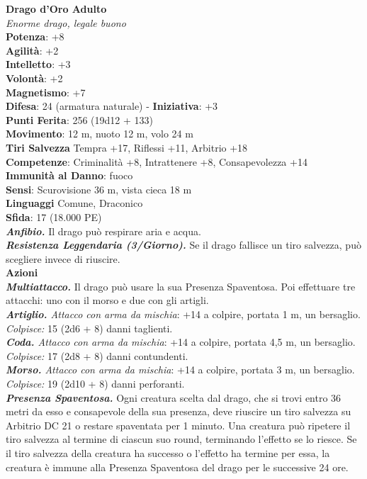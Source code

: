 \begin{multicols}{2}
\medskip\textbf{Drago d'Oro Adulto}\\
\emph{Enorme drago, legale buono}\\
\textbf{Potenza}: +8\\
\textbf{Agilità}: +2\\
\textbf{Intelletto}: +3\\
\textbf{Volontà}: +2\\
\textbf{Magnetismo}: +7\\
\textbf{Difesa}: 24 (armatura naturale) - \textbf{Iniziativa}: +3\\
\textbf{Punti Ferita}: 256 (19d12 + 133)\\
\textbf{Movimento}: 12 m, nuoto 12 m, volo 24 m\\
\textbf{Tiri Salvezza} Tempra +17, Riflessi +11, Arbitrio +18\\
\textbf{Competenze}: Criminalità +8, Intrattenere +8, Consapevolezza +14\\
\textbf{Immunità al Danno}: fuoco\\
\textbf{Sensi}: Scurovisione 36 m, vista cieca 18 m\\
\textbf{Linguaggi} Comune, Draconico\\
\textbf{Sfida}: 17 (18.000 PE)\smallskip\\
\emph{\textbf{Anfibio.}} Il drago può respirare aria e acqua.\\
\emph{\textbf{Resistenza Leggendaria (3/Giorno).}} Se il drago fallisce un tiro salvezza, può scegliere invece di riuscire.\\
\smallskip\textbf{Azioni}\\
\emph{\textbf{Multiattacco.}} Il drago può usare la sua Presenza Spaventosa. Poi effettuare tre attacchi: uno con il morso e due con gli artigli.\\
\emph{\textbf{Artiglio.} Attacco con arma da mischia}: +14 a colpire, portata 1 m, un bersaglio.\\
\emph{Colpisce:} 15 (2d6 + 8) danni taglienti.\\
\emph{\textbf{Coda.} Attacco con arma da mischia}: +14 a colpire, portata 4,5 m, un bersaglio.\\
\emph{Colpisce:} 17 (2d8 + 8) danni contundenti.\\
\emph{\textbf{Morso.} Attacco con arma da mischia}: +14 a colpire, portata 3 m, un bersaglio.\\
\emph{Colpisce:} 19 (2d10 + 8) danni perforanti.\\
\emph{\textbf{Presenza Spaventosa.}} Ogni creatura scelta dal drago, che si trovi entro 36 metri da esso e consapevole della sua presenza, deve riuscire un tiro salvezza su Arbitrio DC 21 o restare spaventata per 1 minuto. Una creatura può ripetere il tiro salvezza al termine di ciascun suo round, terminando l'effetto se lo riesce. Se il tiro salvezza della creatura ha successo o l'effetto ha termine per essa, la creatura è immune alla Presenza Spaventosa del drago per le successive 24 ore.\\

\end{multicols}
